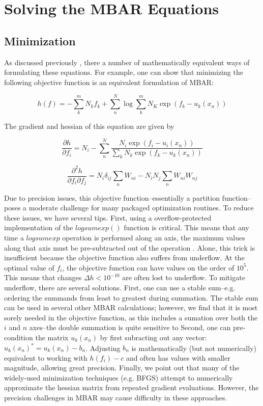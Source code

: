 \documentclass[12pt]{article}
\begin{document}
\section{Solving the MBAR Equations}


\subsection{Minimization}


As discussed previously \cite{}, there a number of mathematically equivalent ways of formulating these equations.  For example, one can show that minimizing the following objective function is an equivalent formulation of MBAR:

$$h(f) = -\sum_k^m N_k f_k + \sum_n^N \log \sum_k^m N_K \exp(f_k -u_k(x_n))$$

The gradient and hessian of this equation are given by

$$\frac{\partial h}{\partial f_i} = N_i - \sum_n^N \frac{N_i \exp(f_i -u_i(x_n))}{\sum_k N_k \exp(f_k - u_k(x_n))}$$

$$\frac{\partial^2 h}{\partial f_i \partial f_j} = N_i \delta_{ij} \sum_n W_{ni} - N_i N_j \sum_n W_{ni} W_{nj}$$

Due to precision issues, this objective function--essentially a partition function--poses a moderate challenge for many packaged optimization routines.  To reduce these issues, we have several tips.  First, using a overflow-protected implementation of the $logsumexp()$ function is critical.  This means that any time a $logsumexp$ operation is performed along an axis, the maximum values along that axis must be pre-subtracted out of the operation \cite{}.  Alone, this trick is insufficient because the objective function also suffers from underflow.  At the optimal value of $f_i$, the objective function can have values on the order of $10^5$.  This means that changes $\Delta h < 10^{-10}$ are often lost to underflow.  To mitigate underflow, there are several solutions.  First, one can use a stable sum--e.g. ordering the summands from least to greatest during summation.  The stable sum can be used in several other MBAR calculations; however, we find that it is most sorely needed in the objective function, as this includes a sumation over both the $i$ and $n$ axes--the double summation is quite sensitive to Second, one can pre-condition the matrix $u_k(x_n)$ by first subracting out any vector: $u_k(x_n)^* = u_k(x_n) - b_n$.  Adjusting $b_n$ is mathematically (but not numerically) equivalent to working with $h(f_i) - c$ and often has values with smaller magnitude, allowing great precision.  Finally, we point out that many of the widely-used minimization techniques (e.g. BFGS) attempt to numerically approximate the hessian matrix from repeated gradient evaluations.  However, the precision challenges in MBAR may cause difficulty in these approaches.  
\end{document}
